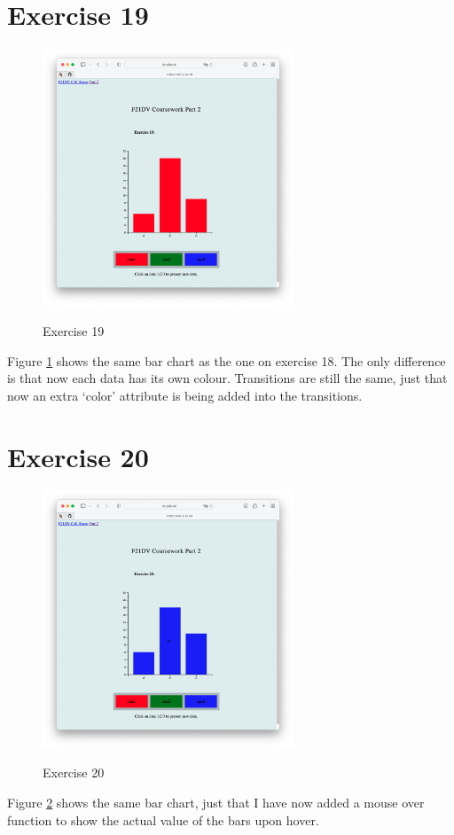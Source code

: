 \documentclass{scrreprt}
\begin{document}
\newpage
\section{Exercise 19}
\begin{figure}[!ht]
    \centering
    \includegraphics[width = 7.5cm]{images/ex19.png}
    \label{fig:ex19}
    \caption{Exercise 19}
\end{figure}
\FloatBarrier
% 
Figure \ref{fig:ex19} shows the same bar chart as the one on exercise 18. The only difference is that now each data has its own colour. Transitions are still the same, just that now an extra `color' attribute is being added into the transitions.

\newpage
\section{Exercise 20}
\begin{figure}[!ht]
    \centering
    \includegraphics[width = 7.5cm]{images/ex20.png}
    \label{fig:ex20}
    \caption{Exercise 20}
\end{figure}
\FloatBarrier
% 
Figure \ref{fig:ex20} shows the same bar chart, just that I have now added a mouse over function to show the actual value of the bars upon hover.
\end{document}
